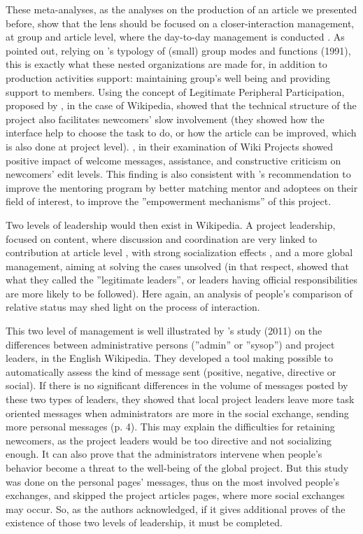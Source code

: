 These meta-analyses, as the analyses on the production of an article
we presented before, show that the lens should be focused on a closer-interaction
management, at group and article level, where the day-to-day management
is conducted \citep{ForteLarcoBruckman09}. As \citet[table 1, p. 2]{Forteetal12}
pointed out, relying on \citeauthor{McGrath91}'s typology of (small)
group modes and functions (1991), this is exactly what these nested
organizations are made for, in addition to production activities support:
maintaining group's well being and providing support to members. Using
the concept of Legitimate Peripheral Participation, proposed by \citet{LaveWenger91},
in the case of Wikipedia, \citet{Bryantetal05} showed that the technical
structure of the project also facilitates newcomers' slow involvement
(they showed how the interface help to choose the task to do, or how
the article can be improved, which is also done at project level).
\citet{Choietal10}, in their examination of Wiki Projects showed
positive impact of welcome messages, assistance, and constructive
criticism on newcomers' edit levels. This finding is also consistent
with \citeauthor{Musicantetal11}'s recommendation to improve the
mentoring program by better matching mentor and adoptees on their
field of interest, to improve the ''empowerment mechanisms'' \citep{HansenBerenteLyytinen09}
of this project.

Two levels of leadership would then exist in Wikipedia. A project
leadership, focused on content, where discussion and coordination
are very linked to contribution at article level \citep{UngDalle10},
with strong socialization effects \citep{Forteetal12}, and a more
global management, aiming at solving the cases unsolved (in that respect,
\citealp{ZhuKrautKittur12} showed that what they called the ''legitimate
leaders'', or leaders having official responsibilities are more likely
to be followed). Here again, an analysis of people's comparison of
relative status \citep{Burt09,LeskovecHuttenlocherKleinberg10b} may
shed light on the process of interaction.

This two level of management is well illustrated by \citeauthor{Zhuetal11}'s
study (2011) on the differences between administrative persons (''admin''
or ''sysop'') and project leaders, in the English Wikipedia. They
developed a tool making possible to automatically assess the kind
of message sent (positive, negative, directive or social). If there
is no significant differences in the volume of messages posted by
these two types of leaders, they showed that local project leaders
leave more task oriented messages when administrators are more in
the social exchange, sending more personal messages (p. 4). This may
explain the difficulties for retaining newcomers, as the project leaders
would be too directive and not socializing enough. It can also prove
that the administrators intervene when people's behavior become a
threat to the well-being of the global project. But this study was
done on the personal pages' messages, thus on the most involved people's
exchanges, and skipped the project articles pages, where more social
exchanges may occur. So, as the authors acknowledged, if it gives
additional proves of the existence of those two levels of leadership,
it must be completed.

